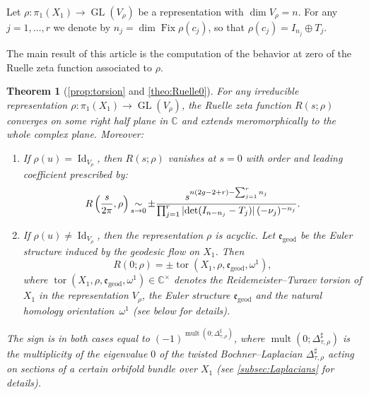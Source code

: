 \documentclass[10pt]{amsart}
\newcommand{\simm}{\mathop{\sim}\displaylimits}
\theoremstyle{plain}
\newtheorem{thmalph}{Theorem}
\theoremstyle{definition}
\theoremstyle{remark}
\newcommand{\C}{\mathbb{C}}
\newcommand{\geod}{\mathrm{geod}}
\DeclareMathOperator{\GL}{GL}
\DeclareMathOperator{\Id}{Id}
\DeclareMathOperator{\Fix}{Fix}
\numberwithin{equation}{section}
\DeclareMathOperator{\tor}{tor}
\DeclareMathOperator{\mult}{mult}
\begin{document}
Let $\rho \colon \pi_1(X_1) \to \GL(V_\rho)$ be a representation with $\dim V_\rho=n$. For any $j=1, \ldots, r$ we denote by $n_j= \dim \Fix \rho(c_j)$, so that $\rho(c_j) = I_{n_j} \oplus T_j$.

The main result of this article is the computation of the behavior at zero of the Ruelle zeta function associated to $\rho$.


\begin{thmalph}[\cref{prop:torsion} and \cref{theo:Ruelle0}]\label{theo:mainFried}
For any irreducible representation $\rho\colon \pi_1(X_1) \to \GL(V_\rho)$, the Ruelle zeta function $R(s;\rho)$ converges on some right half plane in $\C$ and extends meromorphically to the whole complex plane. Moreover:
\begin{enumerate}
\item \label{i1}
If $\rho(u)= \Id_{V_\rho}$, then $R(s;\rho)$ vanishes at $s=0$ with order and leading coefficient prescribed by:
\[
R\left(\frac{s}{2\pi}, \rho\right) \simm_{s \to 0} \pm \frac{s^{n(2g-2+r)-\sum_{j=1}^rn_j}}{\prod_{j=1}^r |{\det}(I_{n-n_j} -T_j)|\,(-\nu_j)^{-n_j}}.
\]

\item \label{i2}
If $\rho(u) \neq\Id_{V_\rho}$, then the representation $\rho$ is acyclic. Let $\mathfrak e_{\geod}$ be the Euler structure induced by the geodesic flow on $X_1$. Then
\[
R(0;\rho) = \pm\tor(X_1,\rho,\mathfrak {e}_{\geod}, \omega^1),
\]
where $\tor(X_1,\rho, \mathfrak e_{\geod}, \omega^1)\in\C^\times$ denotes the Reidemeister--Turaev torsion of $X_1$ in the representation $V_\rho$, the Euler structure $\mathfrak e_{\geod}$ and the natural homology orientation~$\omega^1$ (see below for details).
\end{enumerate}

The sign is in both cases equal to $(-1)^{\mult(0;\Delta_{\tau,\rho}^\sharp)}$, where $\mult(0;\Delta_{\tau,\rho}^\sharp)$ is the multiplicity of the eigenvalue $0$ of the twisted Bochner--Laplacian $\Delta_{\tau,\rho}^\sharp$ acting on sections of a certain orbifold bundle over $X_1$ (see \cref{subsec:Laplacians} for details).
\end{thmalph}
\end{document}
